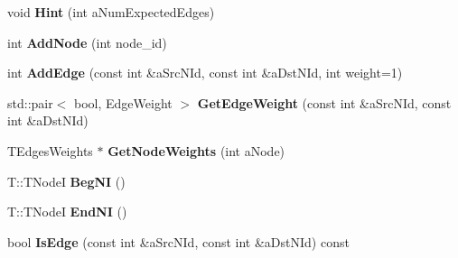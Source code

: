 \begin{DoxyCompactItemize}
\item 
\hypertarget{classall__distance__sketch_1_1graph_1_1Graph_a416617d5902220be6142c5e6d8360805}{}void {\bfseries Hint} (int a\+Num\+Expected\+Edges)\label{classall__distance__sketch_1_1graph_1_1Graph_a416617d5902220be6142c5e6d8360805}

\item 
\hypertarget{classall__distance__sketch_1_1graph_1_1Graph_a77bbd4ece697aadad9f29819862046f9}{}int {\bfseries Add\+Node} (int node\+\_\+id)\label{classall__distance__sketch_1_1graph_1_1Graph_a77bbd4ece697aadad9f29819862046f9}

\item 
\hypertarget{classall__distance__sketch_1_1graph_1_1Graph_ade38cb4d51123f9912048f6cbb6d4947}{}int {\bfseries Add\+Edge} (const int \&a\+Src\+N\+Id, const int \&a\+Dst\+N\+Id, int weight=1)\label{classall__distance__sketch_1_1graph_1_1Graph_ade38cb4d51123f9912048f6cbb6d4947}

\item 
\hypertarget{classall__distance__sketch_1_1graph_1_1Graph_a45a6d5d2d7d627e66090b400dcb7127e}{}std\+::pair$<$ bool, Edge\+Weight $>$ {\bfseries Get\+Edge\+Weight} (const int \&a\+Src\+N\+Id, const int \&a\+Dst\+N\+Id)\label{classall__distance__sketch_1_1graph_1_1Graph_a45a6d5d2d7d627e66090b400dcb7127e}

\item 
\hypertarget{classall__distance__sketch_1_1graph_1_1Graph_a05db9466b4cf6bbb1aab6e7b66363017}{}T\+Edges\+Weights $\ast$ {\bfseries Get\+Node\+Weights} (int a\+Node)\label{classall__distance__sketch_1_1graph_1_1Graph_a05db9466b4cf6bbb1aab6e7b66363017}

\item 
\hypertarget{classall__distance__sketch_1_1graph_1_1Graph_ad928e477aff37d0981953adb8aece737}{}T\+::\+T\+Node\+I {\bfseries Beg\+N\+I} ()\label{classall__distance__sketch_1_1graph_1_1Graph_ad928e477aff37d0981953adb8aece737}

\item 
\hypertarget{classall__distance__sketch_1_1graph_1_1Graph_ac326a690411e4f86c70b810c20af283a}{}T\+::\+T\+Node\+I {\bfseries End\+N\+I} ()\label{classall__distance__sketch_1_1graph_1_1Graph_ac326a690411e4f86c70b810c20af283a}

\item 
\hypertarget{classall__distance__sketch_1_1graph_1_1Graph_a8274ee1c9b099ada99da05e3ef98a483}{}bool {\bfseries Is\+Edge} (const int \&a\+Src\+N\+Id, const int \&a\+Dst\+N\+Id) const \label{classall__distance__sketch_1_1graph_1_1Graph_a8274ee1c9b099ada99da05e3ef98a483}


\end{DoxyCompactItemize}
